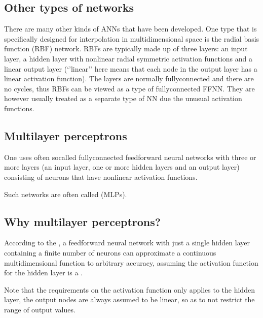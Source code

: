 \documentclass[letterpaper,10pt,english]{sphinxmanual}
\begin{document}
\subsection{Other types of networks}
\label{\detokenize{chapter6:other-types-of-networks}}
There are many other kinds of ANNs that have been developed. One type
that is specifically designed for interpolation in multidimensional
space is the radial basis function (RBF) network. RBFs are typically
made up of three layers: an input layer, a hidden layer with
non\sphinxhyphen{}linear radial symmetric activation functions and a linear output
layer (‘’linear’’ here means that each node in the output layer has a
linear activation function). The layers are normally fully\sphinxhyphen{}connected
and there are no cycles, thus RBFs can be viewed as a type of
fully\sphinxhyphen{}connected FFNN. They are however usually treated as a separate
type of NN due the unusual activation functions.


\subsection{Multilayer perceptrons}
\label{\detokenize{chapter6:multilayer-perceptrons}}
One uses often so\sphinxhyphen{}called fully\sphinxhyphen{}connected feed\sphinxhyphen{}forward neural networks
with three or more layers (an input layer, one or more hidden layers
and an output layer) consisting of neurons that have non\sphinxhyphen{}linear
activation functions.

Such networks are often called  (MLPs).


\subsection{Why multilayer perceptrons?}
\label{\detokenize{chapter6:why-multilayer-perceptrons}}
According to the , a feed\sphinxhyphen{}forward
neural network with just a single hidden layer containing a finite
number of neurons can approximate a continuous multidimensional
function to arbitrary accuracy, assuming the activation function for
the hidden layer is a .

Note that the requirements on the activation function only applies to
the hidden layer, the output nodes are always assumed to be linear, so
as to not restrict the range of output values.
\end{document}
